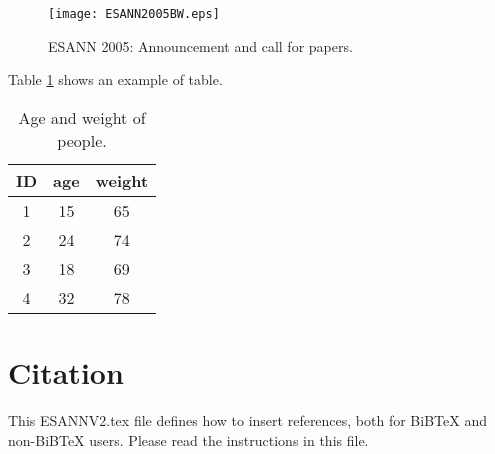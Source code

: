 \documentclass{esannV2}
\begin{document}
\begin{figure}[h!]
\centering
\texttt{[image: ESANN2005BW.eps]}
\caption{ESANN 2005: Announcement and call for
papers.}\label{Fig:MV}
\end{figure}

Table \ref{Tab:AgeWeight} shows an example of table.

\begin{table}[h!]
  \centering
  \begin{tabular}{|c|c|c|}
    \hline
    ID & age & weight \\
    \hline
    1& 15 & 65 \\
    2& 24 & 74\\
    3& 18 & 69 \\
    4& 32 & 78 \\
    \hline
  \end{tabular}
  \caption{Age and weight of people.}\label{Tab:AgeWeight}
\end{table}

\section{Citation}

This ESANNV2.tex file defines how to insert references, both for
BiBTeX and non-BiBTeX users.  Please read the instructions in this
file.
\end{document}
